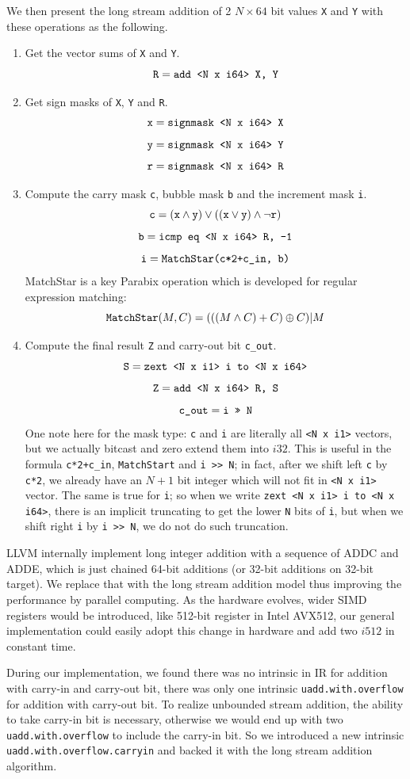 We then present the long stream addition of 2 $N \times 64$ bit values {\tt X} and {\tt Y} with these operations as the following.
\begin{enumerate}
    \item Get the vector sums of {\tt X} and {\tt Y}.
    \[\text{\tt R} = \text{\tt add <N x i64> X, Y} \]
    \item Get sign masks of {\tt X}, {\tt Y} and {\tt R}.
    \[\text{\tt x} = \text{\tt signmask <N x i64> X} \]
    \[\text{\tt y} = \text{\tt signmask <N x i64> Y} \]
    \[\text{\tt r} = \text{\tt signmask <N x i64> R} \]
    \item Compute the carry mask {\tt c}, bubble mask {\tt b} and the increment mask {\tt i}.
    \[\text{\tt c} = (\text{\tt x} \wedge \text{\tt y}) \vee ((\text{\tt x} \vee \text{\tt y}) \wedge \neg \text{\tt r})\]
    \[\text{\tt b} = \text{\tt icmp eq <N x i64> R, -1}\]
    \[\text{\tt i} = \text{\tt MatchStar(c*2+c\_in, b)}\]
    MatchStar is a key Parabix operation which is developed for regular expression matching:
    \[\text{\tt MatchStar}(M, C) = (((M \wedge C) + C)  \oplus C) | M\]
    \item Compute the final result {\tt Z} and carry-out bit {\tt c\_out}.
    \[\text{\tt S} = \text{\tt zext <N x i1> i to <N x i64>}\]
    \[\text{\tt Z} = \text{\tt add <N x i64> R, S}\]
    \[\text{\tt c\_out} = \text{\tt i >> N}\]
    One note here for the mask type: {\tt c} and {\tt i} are literally all \verb|<N x i1>| vectors, but we actually bitcast and zero extend them into $i32$. This is useful in the formula {\tt c*2+c\_in}, {\tt MatchStart} and {\tt i >> N}; in fact, after we shift left {\tt c} by {\tt c*2}, we already have an $N+1$ bit integer which will not fit in \verb|<N x i1>| vector. The same is true for {\tt i}; so when we write {\tt zext <N x i1> i to <N x i64>}, there is an implicit truncating to get the lower {\tt N} bits of {\tt i}, but when we shift right {\tt i} by {\tt i >> N}, we do not do such truncation.
\end{enumerate}

LLVM internally implement long integer addition with a sequence of ADDC and ADDE, which is just chained 64-bit additions (or 32-bit additions on 32-bit target). We replace that with the long stream addition model thus improving the performance by parallel computing. As the hardware evolves, wider SIMD registers would be introduced, like 512-bit register in Intel AVX512, our general implementation could easily adopt this change in hardware and add two $i512$ in constant time.

During our implementation, we found there was no intrinsic in IR for addition with carry-in and carry-out bit, there was only one intrinsic {\tt uadd.with.overflow} for addition with carry-out bit. To realize unbounded stream addition, the ability to take carry-in bit is necessary, otherwise we would end up with two {\tt uadd.with.overflow} to include the carry-in bit. So we introduced a new intrinsic {\tt uadd.with.overflow.carryin} and backed it with the long stream addition algorithm.
